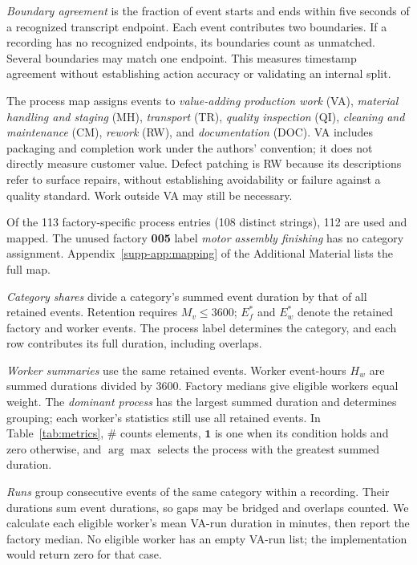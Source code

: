 \emph{Boundary agreement} is the fraction of event starts and ends within five seconds of a recognized transcript endpoint. Each event contributes two boundaries. If a recording has no recognized endpoints, its boundaries count as unmatched. Several boundaries may match one endpoint. This measures timestamp agreement without establishing action accuracy or validating an internal split.

The process map assigns events to \emph{value-adding production work} (VA), \emph{material handling and staging} (MH), \emph{transport} (TR), \emph{quality inspection} (QI), \emph{cleaning and maintenance} (CM), \emph{rework} (RW), and \emph{documentation} (DOC). VA includes packaging and completion work under the authors' convention; it does not directly measure customer value. Defect patching is RW because its descriptions refer to surface repairs, without establishing avoidability or failure against a quality standard. Work outside VA may still be necessary.

Of the 113 factory-specific process entries (108 distinct strings), 112 are used and mapped. The unused factory \textbf{005} label \emph{motor assembly finishing} has no category assignment. Appendix~\ref{supp-app:mapping} of the Additional Material lists the full map.

\emph{Category shares} divide a category's summed event duration by that of all retained events. Retention requires $M_v\leq3600$; $E_f^*$ and $E_w^*$ denote the retained factory and worker events. The process label determines the category, and each row contributes its full duration, including overlaps.

\emph{Worker summaries} use the same retained events. Worker event-hours $H_w$ are summed durations divided by 3600. Factory medians give eligible workers equal weight. The \emph{dominant process} has the largest summed duration and determines grouping; each worker's statistics still use all retained events. In Table~\ref{tab:metrics}, $\#$ counts elements, $\mathbf{1}$ is one when its condition holds and zero otherwise, and $\arg\max$ selects the process with the greatest summed duration.

\emph{Runs} group consecutive events of the same category within a recording. Their durations sum event durations, so gaps may be bridged and overlaps counted. We calculate each eligible worker's mean VA-run duration in minutes, then report the factory median. No eligible worker has an empty VA-run list; the implementation would return zero for that case.

